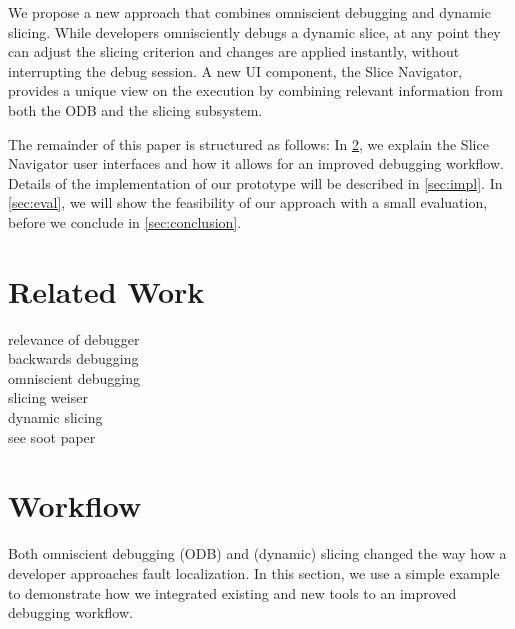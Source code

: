 ﻿\documentclass[
      english,
      ]{llncs}
\begin{document}
We propose a new approach that combines omniscient debugging and dynamic slicing.
While developers omnisciently debugs a dynamic slice, at any point they can adjust the slicing criterion and changes are applied instantly, without interrupting the debug session.
A new UI component, the Slice Navigator, provides a unique view on the execution by combining relevant information from both the ODB and the slicing subsystem.






The remainder of this paper is structured as follows:
In \cref{sec:workflow}, we explain the Slice Navigator user interfaces and how it allows for an improved debugging workflow.
Details of the implementation of our prototype will be described in \cref{sec:impl}.
In \cref{sec:eval}, we will show the feasibility of our approach with a small evaluation, before we conclude in \cref{sec:conclusion}.

\section{Related Work}

relevance of debugger\\

backwards debugging\\
omniscient debugging\\

slicing weiser \cite{weiser_programmers_1982} \\
dynamic slicing\\
see soot paper\\

\section{Workflow}
\label{sec:workflow}

Both omniscient debugging (ODB) and (dynamic) slicing changed the way how a developer approaches fault localization.
In this section, we use a simple example to demonstrate how we integrated existing and new tools to an improved debugging workflow.
\end{document}
